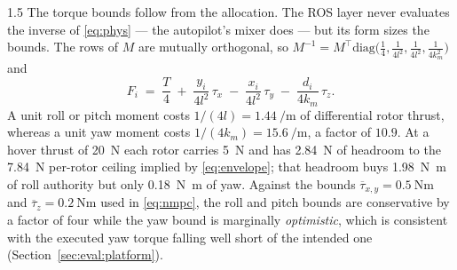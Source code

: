 \begin{spacing}{1.5}
The torque bounds follow from the allocation. The ROS layer never evaluates the
inverse of \eqref{eq:phys} --- the autopilot's mixer does --- but its form sizes
the bounds. The rows of $M$ are mutually orthogonal, so
$M^{-1} = M^{\!\top}\mathrm{diag}\bigl(\tfrac{1}{4}, \tfrac{1}{4l^2},
\tfrac{1}{4l^2}, \tfrac{1}{4k_m^2}\bigr)$ and
\begin{equation}
F_i \;=\; \frac{T}{4}
 \;+\; \frac{y_i}{4l^2}\,\tau_x
 \;-\; \frac{x_i}{4l^2}\,\tau_y
 \;-\; \frac{d_i}{4k_m}\,\tau_z .
\label{eq:mixerinv}
\end{equation}
A unit roll or pitch moment costs $1/(4l) = \SI{1.44}{\per\meter}$ of
differential rotor thrust, whereas a unit yaw moment costs
$1/(4k_m) = \SI{15.6}{\per\meter}$, a factor of $10.9$. At a hover thrust of
\SI{20}{\newton} each rotor carries \SI{5}{\newton} and has \SI{2.84}{\newton} of
headroom to the \SI{7.84}{\newton} per-rotor ceiling implied by
\eqref{eq:envelope}; that headroom buys \SI{1.98}{\newton\meter} of roll
authority but only \SI{0.18}{\newton\meter} of yaw. Against the bounds
$\overline\tau_{x,y} = \SI{0.5}{\newton\meter}$ and
$\overline\tau_z = \SI{0.2}{\newton\meter}$ used in \eqref{eq:nmpc}, the roll
and pitch bounds are conservative by a factor of four while the yaw bound is
marginally \emph{optimistic}, which is consistent with the executed yaw torque
falling well short of the intended one (Section~\ref{sec:eval:platform}).


\end{spacing}
